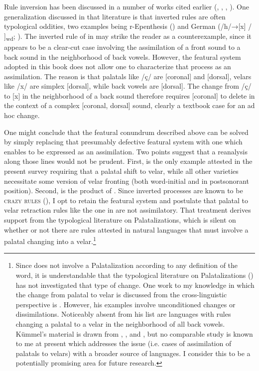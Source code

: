 Rule inversion has been discussed in a number of works cited earlier (\citealt{Vennemann1972}, \citealt{McCarthy1991}, \citealt{Blevins2004}, \citealt{Hall2009a}). One generalization discussed in that literature is that inverted rules are often typological oddities, two examples being  r-Epenthesis () and  German  (/h/→[x] /{\longrule} ]\textsubscript{wd}; \citealt{Hall2009a,Hall2010,Hall2009a,Hall2011a}). The inverted rule of  in  may strike the reader as a counterexample, since it appears to be a clear-cut case involving the assimilation of a front sound to a back sound in the neighborhood of back vowels. However, the featural system adopted in this book does not allow one to characterize that process as an assimilation. The reason is that palatals like /ç/ are [coronal] and [dorsal], velars like /x/ are simplex [dorsal], while back vowels are [dorsal]. The change from /ç/ to [x] in the neighborhood of a back sound therefore requires [coronal] to delete in the context of a complex [coronal, dorsal] sound, clearly a textbook case for an ad hoc change.

\begin{sloppypar}
One might conclude that the featural conundrum described above can be solved by simply replacing that presumably defective featural system with one which enables  to be expressed as an assimilation. Two points suggest that a reanalysis along those lines would not be prudent. First,  is the only example attested in the present survey requiring that a palatal shift to velar, while all other varieties necessitate some version of velar fronting (both word-initial and in postsonorant position). Second,  is the product of . Since inverted processes are known to be \textsc{crazy} \textsc{rules} (\citealt{BachHarms1972}), I opt to retain the featural system and postulate that palatal to velar retraction rules like the one in  are not assimilatory. That treatment derives support from the typological literature on Palatalizations, which is silent on whether or not there are rules attested in natural languages that must involve a palatal changing into a velar.\footnote{Since  does not involve a Palatalization according to any definition of the word, it is understandable that the typological literature on Palatalizations () has not investigated that type of change. One work to my knowledge in which the change from palatal to velar is discussed from the cross-linguistic perspective is \citet[241--243]{Kümmel2007}. However, his examples involve unconditioned changes or dissimilations. Noticeably absent from his list are languages with rules changing a palatal to a velar in the neighborhood of all back vowels. Kümmel’s material is drawn from , , and , but no comparable study is known to me at present which addresses the issue (i.e. cases of assimilation of palatals to velars) with a broader source of languages. I consider this to be a potentially promising area for future research.}
\end{sloppypar}

